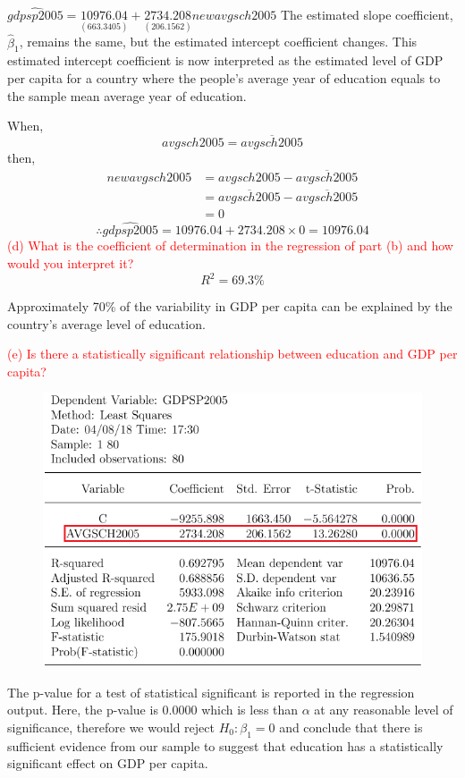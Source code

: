 \documentclass[12pt]{report}
\begin{document}
\vspace{-\baselineskip}
\centering $\widehat{gdpsp2005} = \underset{(663.3405)}{10976.04} + \underset{(206.1562)}{2734.208}newavgsch2005 $
\justify The estimated slope coefficient, $\hat{\beta}_1$, remains the same, but the estimated intercept coefficient changes. This estimated intercept coefficient is now interpreted as the estimated level of GDP per capita for a country where the people's average year of education equals to the sample mean average year of education. 

\noindent When, $$avgsch2005 = \overline{avgsch2005}$$ then, \begin{align*}
	newavgsch2005 &= avgsch2005 - \overline{avgsch2005} \\
	&= \overline{avgsch2005} - \overline{avgsch2005} \\
	&= 0
\end{align*}
$$\therefore \widehat{gdpsp2005} = 10976.04 + 2734.208 \times 0 = 10976.04$$
\noindent \textcolor{red}{(d) What is the coefficient of determination in the regression of part (b) and how would you interpret it?} $$R^2 = 69.3\%$$

\noindent Approximately 70\% of the variability in GDP per capita can be explained by the country's average level of education.

\noindent \textcolor{red}{(e) Is there a statistically significant relationship between education and GDP per capita?} 
\begin{figure}[H]
	\centering
	\includegraphics{tute6_q4_7}
\end{figure}
\vspace{-\baselineskip}
\noindent The p-value for a test of statistical significant is reported in the regression output. Here, the p-value is $0.0000$ which is less than $\alpha$ at any reasonable level of significance, therefore we would reject $H_0: \beta_1 = 0$ and conclude that there is sufficient evidence from our sample to suggest that education has a statistically significant effect on GDP per capita.
\end{document}
